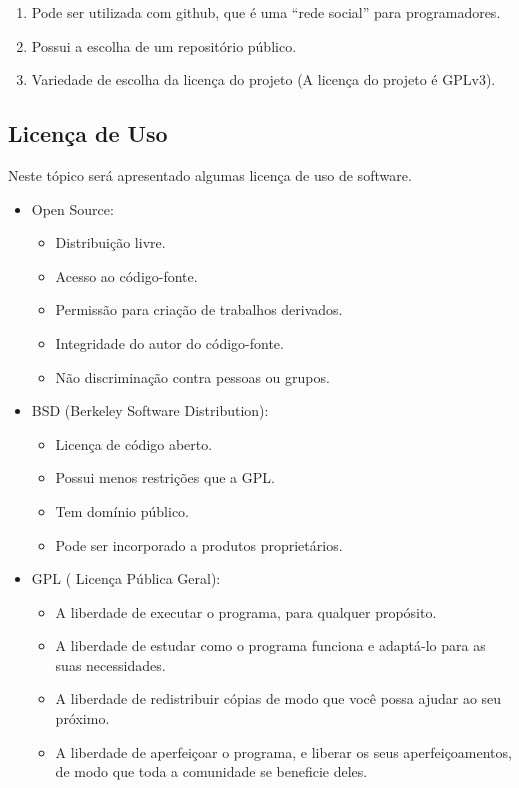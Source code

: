 \documentclass[12pt,a4paper]{article}
\begin{document}
\begin{enumerate}
\item Pode ser utilizada com github, que é uma “rede social” para programadores.
\item Possui a escolha de um repositório público.
\item Variedade de escolha da licença do projeto (A licença do projeto é GPLv3).
\end{enumerate}

\subsection {Licença de Uso}

Neste tópico será apresentado algumas licença de uso de software.

\begin{itemize}
\item Open Source:
\begin{itemize}
\item Distribuição livre.
\item Acesso ao código-fonte.
\item Permissão para criação de trabalhos derivados.
\item Integridade do autor do código-fonte.
\item Não discriminação contra pessoas ou grupos.
\end{itemize}

\item BSD (Berkeley Software Distribution):
\begin{itemize}
\item Licença de código aberto.
\item Possui menos restrições que a GPL.
\item Tem domínio público.
\item Pode ser incorporado a produtos proprietários.
\end{itemize}


\item GPL ( Licença Pública Geral):
\begin{itemize}
\item A liberdade de executar o programa, para qualquer propósito.
\item A liberdade de estudar como o programa funciona e adaptá-lo para as suas necessidades.
\item A liberdade de redistribuir cópias de modo que você possa ajudar ao seu próximo.
\item A liberdade de aperfeiçoar o programa, e liberar os seus aperfeiçoamentos, de modo que toda a comunidade se beneficie deles.
\end{itemize}


\end{itemize}
\end{document}
